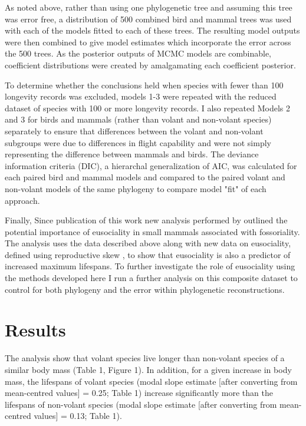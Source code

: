 As noted above, rather than using one phylogenetic tree and assuming this tree was error free, a distribution of 500 combined bird and mammal trees was used with each of the models fitted to each of these trees. The resulting model outputs were then combined to give model estimates which incorporate the error across the 500 trees. As the posterior outputs of MCMC models are combinable, coefficient distributions were created by amalgamating each coefficient posterior. 

To determine whether the conclusions held when species with fewer than 100 longevity records was excluded, models 1-3 were repeated with the reduced dataset of species with 100 or more longevity records. I also repeated Models 2 and 3 for birds and mammals (rather than volant and non-volant species) separately to ensure that differences between the volant and non-volant subgroups were due to differences in flight capability and were not simply representing the difference between mammals and birds. The deviance information criteria (DIC), a hierarchal generalization of AIC, was calculated for each paired bird and mammal models and compared to the paired volant and non-volant models of the same phylogeny to compare model "fit" of each approach.

Finally, Since publication of this work \citep{healy2014ecology} new analysis performed by \cite{williams2015ecology} outlined the potential importance of eusociality in small mammals associated with fossoriality. The analysis uses the data described above along with new data on eusociality, defined using reproductive skew \citep{williams2015ecology}, to show that eusociality is also a predictor of increased maximum lifespans. To further investigate the role of eusociality using the methods developed here I run a further analysis on this composite dataset to control for both phylogeny and the error within phylogenetic reconstructions.

\section{Results}

The analysis show that volant species live longer than non-volant species of a similar body mass (Table 1, Figure 1). In addition, for a given increase in body mass, the lifespans of volant species (modal slope estimate [after converting from mean-centred values] = 0.25; Table 1) increase significantly more than the lifespans of non-volant species (modal slope estimate [after converting from mean-centred values] = 0.13; Table 1).


